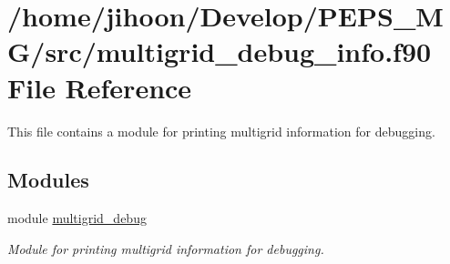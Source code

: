 \hypertarget{multigrid__debug__info_8f90}{}\section{/home/jihoon/\+Develop/\+P\+E\+P\+S\+\_\+\+M\+G/src/multigrid\+\_\+debug\+\_\+info.f90 File Reference}
\label{multigrid__debug__info_8f90}


This file contains a module for printing multigrid information for debugging.  


\subsection*{Modules}
\begin{DoxyCompactItemize}
\item 
module \hyperlink{namespacemultigrid__debug}{multigrid\+\_\+debug}
\begin{DoxyCompactList}\small\item\em Module for printing multigrid information for debugging. \end{DoxyCompactList}\end{DoxyCompactItemize}
